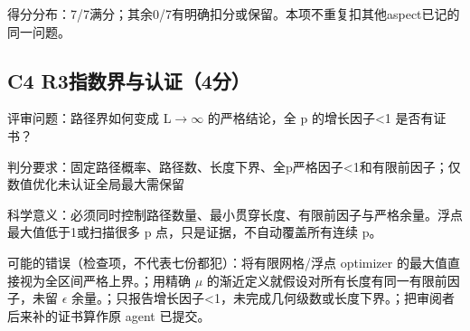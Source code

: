 \documentclass[11pt,a4paper]{article}
\begin{document}
得分分布：7/7满分；其余0/7有明确扣分或保留。本项不重复扣其他aspect已记的同一问题。

\clearpage
\subsection{C4 R3指数界与认证（4分）}
\label{aspect:C4}
评审问题：路径界如何变成 L\ensuremath{\rightarrow}\ensuremath{\infty} 的严格结论，全 p 的增长因子<1 是否有证书？

判分要求：固定路径概率、路径数、长度下界、全p严格因子<1和有限前因子；仅数值优化未认证全局最大需保留

科学意义：必须同时控制路径数量、最小贯穿长度、有限前因子与严格余量。浮点最大值低于1或扫描很多 p 点，只是证据，不自动覆盖所有连续 p。

可能的错误（检查项，不代表七份都犯）：将有限网格/浮点 optimizer 的最大值直接视为全区间严格上界。；用精确 \ensuremath{\mu} 的渐近定义就假设对所有长度有同一有限前因子，未留 \ensuremath{\epsilon} 余量。；只报告增长因子<1，未完成几何级数或长度下界。；把审阅者后来补的证书算作原 agent 已提交。
\end{document}
